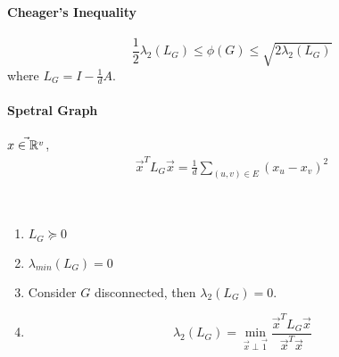 \paragraph{Cheager's Inequality}
\[\frac{1}{2}\lambda_2(L_G) \leq \phi(G) \leq \sqrt{2\lambda_2(L_G)}\]
where  $ L_G=I-\frac 1 d A $.
\paragraph{Spetral Graph}
 $ \vec{x\in \mathbb R^v} $,
 \[\begin{aligned}
    \vec{x}^TL_G\vec{x}=\frac{1}{d}\sum_{(u,v)\in E}(x_u-x_v)^2
 \end{aligned}\]    
\begin{claim}
    \,\\
    \begin{enumerate}
        \item  $ L_G\succcurlyeq 0 $
        \item  $ \lambda_{min}(L_G)=0 $  
        \item Consider  $ G $ disconnected, then  $ \lambda_2(L_G)=0 $.
        \item \[\lambda_2(L_G)=\min_{\vec{x}\perp \vec{1}}\frac{\vec{x}^TL_G\vec{x}}{\vec{x}^T\vec{x}}\]  
    \end{enumerate}
\end{claim}